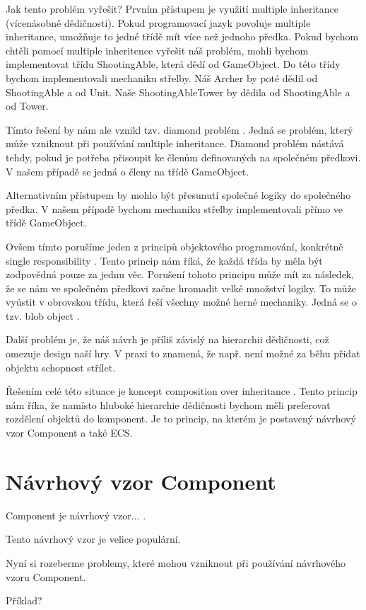 Jak tento problém vyřešit? Prvním přístupem je využití multiple inheritance  (vícenásobné dědičnosti). Pokud programovací jazyk povoluje multiple inheritance, umožňuje to jedné třídě mít více než jednoho předka. Pokud bychom chtěli pomocí multiple inheritence vyřešit náš problém, mohli bychom implementovat třídu ShootingAble, která dědí od GameObject. Do této třídy bychom implementovali mechaniku střelby. Náš Archer by poté dědil od ShootingAble a od Unit. Naše ShootingAbleTower by dědila od ShootingAble a od Tower.

Tímto řešení by nám ale vznikl tzv. diamond problém . Jedná se problém, který může vzniknout při používání multiple inheritance. Diamond problém nástává tehdy, pokud je potřeba přisoupit ke členům definovaných na společném předkovi. V našem případě se jedná o členy na třídě GameObject.

Alternativním přístupem by mohlo být přesunutí společné logiky do společného předka. V našem případě bychom mechaniku střelby implementovali přímo ve třídě GameObject.

Ovšem tímto porušíme jeden z principů objektového programování, konkrétně single responsibility . Tento princip nám říká, že každá třída by měla být zodpovědná pouze za jednu věc. Porušení tohoto principu může mít za následek, že se nám ve společném předkovi začne hromadit velké množství logiky. To může vyústit v obrovskou třídu, která řeší všechny možné herné mechaniky. Jedná se o tzv. blob object . 

Další problém je, že náš návrh je příliš závislý na hierarchii dědičnosti, což omezuje design naší hry. V praxi to znamená, že např. není možné za běhu přidat objektu schopnost střílet.

Řešením celé této situace je koncept composition over inheritance . Tento princip nám říka, že namísto hluboké hierarchie dědičnosti bychom měli preferovat rozdělení objektů do komponent. Je to princip, na kterém je postavený návrhový vzor Component a také ECS.


\section{Návrhový vzor Component}
Component je návrhový vzor... .

Tento návrhový vzor je velice populární.

Nyní si rozeberme problemy, které mohou vzniknout při používání návrhového vzoru Component.

Příklad?